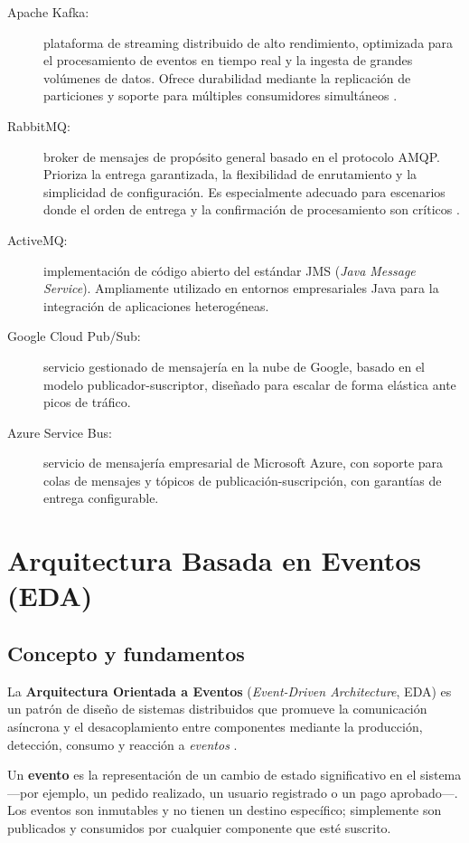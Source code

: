 \documentclass[12pt,a4paper]{article}
\begin{document}
\begin{description}
  \item[Apache Kafka:] plataforma de streaming distribuido de alto rendimiento, optimizada para el procesamiento de eventos en tiempo real y la ingesta de grandes volúmenes de datos. Ofrece durabilidad mediante la replicación de particiones y soporte para múltiples consumidores simultáneos \cite{ref19}.
  \item[RabbitMQ:] broker de mensajes de propósito general basado en el protocolo AMQP. Prioriza la entrega garantizada, la flexibilidad de enrutamiento y la simplicidad de configuración. Es especialmente adecuado para escenarios donde el orden de entrega y la confirmación de procesamiento son críticos \cite{ref20}.
  \item[ActiveMQ:] implementación de código abierto del estándar JMS (\textit{Java Message Service}). Ampliamente utilizado en entornos empresariales Java para la integración de aplicaciones heterogéneas.
  \item[Google Cloud Pub/Sub:] servicio gestionado de mensajería en la nube de Google, basado en el modelo publicador-suscriptor, diseñado para escalar de forma elástica ante picos de tráfico.
  \item[Azure Service Bus:] servicio de mensajería empresarial de Microsoft Azure, con soporte para colas de mensajes y tópicos de publicación-suscripción, con garantías de entrega configurable.
\end{description}
 
\section{Arquitectura Basada en Eventos (EDA)}
 
\subsection{Concepto y fundamentos}
 
La \textbf{Arquitectura Orientada a Eventos} (\textit{Event-Driven Architecture}, EDA) es un patrón de diseño de sistemas distribuidos que promueve la comunicación asíncrona y el desacoplamiento entre componentes mediante la producción, detección, consumo y reacción a \textit{eventos} \cite{ref21}.
 
Un \textbf{evento} es la representación de un cambio de estado significativo en el sistema —por ejemplo, un pedido realizado, un usuario registrado o un pago aprobado—. Los eventos son inmutables y no tienen un destino específico; simplemente son publicados y consumidos por cualquier componente que esté suscrito.
 
\end{document}
